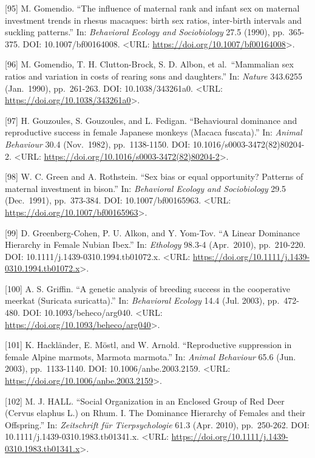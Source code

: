 \documentclass[
]{article}
\begin{document}
{[}95{]} M. Gomendio. ``The influence of maternal rank and infant sex on
maternal investment trends in rhesus macaques: birth sex ratios,
inter-birth intervals and suckling patterns.'' In: \emph{Behavioral
Ecology and Sociobiology} 27.5 (1990), pp.~365-375. DOI:
10.1007/bf00164008. \textless URL:
\url{https://doi.org/10.1007/bf00164008}\textgreater.

{[}96{]} M. Gomendio, T. H. Clutton-Brock, S. D. Albon, et
al.~``Mammalian sex ratios and variation in costs of rearing sons and
daughters.'' In: \emph{Nature} 343.6255 (Jan.~1990), pp.~261-263. DOI:
10.1038/343261a0. \textless URL:
\url{https://doi.org/10.1038/343261a0}\textgreater.

{[}97{]} H. Gouzoules, S. Gouzoules, and L. Fedigan. ``Behavioural
dominance and reproductive success in female Japanese monkeys (Macaca
fuscata).'' In: \emph{Animal Behaviour} 30.4 (Nov.~1982), pp.~1138-1150.
DOI: 10.1016/s0003-3472(82)80204-2. \textless URL:
\url{https://doi.org/10.1016/s0003-3472(82)80204-2}\textgreater.

{[}98{]} W. C. Green and A. Rothstein. ``Sex bias or equal opportunity?
Patterns of maternal investment in bison.'' In: \emph{Behavioral Ecology
and Sociobiology} 29.5 (Dec.~1991), pp.~373-384. DOI:
10.1007/bf00165963. \textless URL:
\url{https://doi.org/10.1007/bf00165963}\textgreater.

{[}99{]} D. Greenberg-Cohen, P. U. Alkon, and Y. Yom-Tov. ``A Linear
Dominance Hierarchy in Female Nubian Ibex.'' In: \emph{Ethology} 98.3-4
(Apr.~2010), pp.~210-220. DOI: 10.1111/j.1439-0310.1994.tb01072.x.
\textless URL:
\url{https://doi.org/10.1111/j.1439-0310.1994.tb01072.x}\textgreater.

{[}100{]} A. S. Griffin. ``A genetic analysis of breeding success in the
cooperative meerkat (Suricata suricatta).'' In: \emph{Behavioral
Ecology} 14.4 (Jul. 2003), pp.~472-480. DOI: 10.1093/beheco/arg040.
\textless URL: \url{https://doi.org/10.1093/beheco/arg040}\textgreater.

{[}101{]} K. Hackländer, E. Möstl, and W. Arnold. ``Reproductive
suppression in female Alpine marmots, Marmota marmota.'' In:
\emph{Animal Behaviour} 65.6 (Jun. 2003), pp.~1133-1140. DOI:
10.1006/anbe.2003.2159. \textless URL:
\url{https://doi.org/10.1006/anbe.2003.2159}\textgreater.

{[}102{]} M. J. HALL. ``Social Organization in an Enclosed Group of Red
Deer (Cervus elaphus L.) on Rhum. I. The Dominance Hierarchy of Females
and their Offspring.'' In: \emph{Zeitschrift für Tierpsychologie} 61.3
(Apr. 2010), pp.~250-262. DOI: 10.1111/j.1439-0310.1983.tb01341.x.
\textless URL:
\url{https://doi.org/10.1111/j.1439-0310.1983.tb01341.x}\textgreater.
\end{document}
